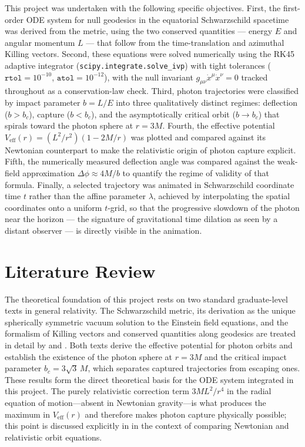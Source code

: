 \documentclass[12pt,a4paper]{article}
\begin{document}
This project was undertaken with the following specific objectives. First, the first-order ODE system for null geodesics in the equatorial Schwarzschild spacetime was derived from the metric, using the two conserved quantities — energy $E$ and angular momentum $L$ — that follow from the time-translation and azimuthal Killing vectors. Second, these equations were solved numerically using the RK45 adaptive integrator (\texttt{scipy.integrate.solve\_ivp}) with tight tolerances ($\texttt{rtol} = 10^{-10}$, $\texttt{atol} = 10^{-12}$), with the null invariant $g_{\mu\nu}\dot{x}^{\mu}\dot{x}^{\nu} = 0$ tracked throughout as a conservation-law check. Third, photon trajectories were classified by impact parameter $b = L/E$ into three qualitatively distinct regimes: deflection ($b > b_{c}$), capture ($b < b_{c}$), and the asymptotically critical orbit ($b \to b_{c}$) that spirals toward the photon sphere at $r = 3M$. Fourth, the effective potential $V_{\mathrm{eff}}(r) = (L^{2}/r^{2})(1 - 2M/r)$ was plotted and compared against its Newtonian counterpart to make the relativistic origin of photon capture explicit. Fifth, the numerically measured deflection angle was compared against the weak-field approximation
$\Delta\phi \approx 4M/b$ to quantify the regime of validity of that formula. Finally, a selected trajectory was animated in Schwarzschild coordinate time $t$ rather than the affine parameter $\lambda$, achieved by interpolating the spatial coordinates onto a uniform $t$-grid, so that the progressive slowdown of the photon near the horizon — the signature of gravitational time dilation as seen by a distant observer — is directly visible in the animation.


\section{Literature Review}

The theoretical foundation of this project rests on two standard graduate-level texts in general relativity. The Schwarzschild metric, its derivation as the unique spherically symmetric vacuum solution to the Einstein field equations, and the formalism of Killing vectors and conserved quantities along geodesics are treated in detail by \citet{Schutz2022} and \citet{Hobson2006}. Both texts derive the effective potential for photon orbits and establish the existence of the photon sphere at $r = 3M$ and the critical impact parameter $b_c = 3\sqrt{3}\,M$, which separates captured trajectories from escaping ones. These results form the direct theoretical basis for the ODE system integrated in this project. The purely relativistic correction term $3ML^2/r^4$ in the radial equation of motion—absent in Newtonian gravity—is what produces the maximum in $V_\text{eff}(r)$ and therefore makes photon capture physically possible; this point is discussed explicitly in \citet{Hobson2006} in the context of comparing Newtonian and relativistic orbit equations.
\end{document}
